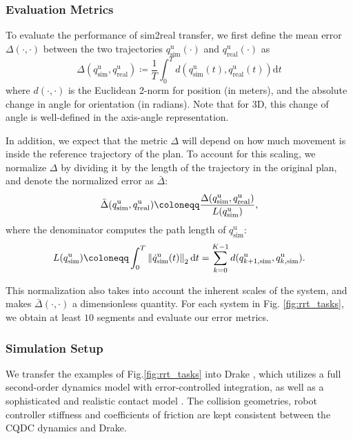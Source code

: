 \subsubsection{Evaluation Metrics}
To evaluate the performance of sim2real transfer, we first define the mean error $\Delta(\cdot,\cdot)$ between the two trajectories $q_\mathrm{sim}^\mathrm{u}(\cdot)$ and $q_\mathrm{real}^\mathrm{u}(\cdot)$ as
\begin{equation}
\Delta(q_\mathrm{sim}^\mathrm{u}, q_\mathrm{real}^\mathrm{u}) \coloneqq 
\frac{1}{T}
\int^T_{0} d\left(q_\mathrm{sim}^\mathrm{u}(t), q_\mathrm{real}^\mathrm{u}(t)\right) \mathrm{d}t
\end{equation}
where $d(\cdot,\cdot)$ is the Euclidean 2-norm for position (in meters), and the absolute change in angle for orientation (in radians). Note that for 3D, this change of angle is well-defined in the axis-angle representation. 

In addition, we expect that the metric $\Delta$ will depend on how much movement is inside the reference trajectory of the plan. To account for this scaling, we normalize $\Delta$ by dividing it by the length of the trajectory in the original plan, and denote the normalized error as $\bar{\Delta}$:
\begin{equation}
\bar{\Delta}(\qusimp, \qurealp) \coloneqq 
\frac{\Delta (q_\mathrm{sim}^\mathrm{u}, q_\mathrm{real}^\mathrm{u})}
{L(q_\mathrm{sim}^\mathrm{u})}
,
\end{equation}
where the denominator computes the path length of $q_\mathrm{sim}^\mathrm{u}$: 
\begin{equation}
L(q_\mathrm{sim}^\mathrm{u}) \coloneqq 
\int_0^T \norm{\Dot{q}_\mathrm{sim}^\mathrm{u}(t)}_2 \mathrm{d} t =
\sum^{K - 1}_{k=0}d(q^\mathrm{u}_{k+1,\mathrm{sim}}, q^\mathrm{u}_{k,\mathrm{sim}}).
\end{equation}

This normalization also takes into account the inherent scales of the system, and makes $\bar{\Delta}(\cdot,\cdot)$ a dimensionless quantity. For each system in Fig. \ref{fig:rrt_tasks}, we obtain at least $10$ segments and evaluate our error metrics. 

\subsubsection{Simulation Setup}
We transfer the examples of Fig.\ref{fig:rrt_tasks} into Drake \cite{drake}, which utilizes a full second-order dynamics model with error-controlled integration, as well as a sophisticated and realistic contact model \cite{tamsi}. The collision geometries, robot controller stiffness and coefficients of friction are kept consistent between the CQDC dynamics and Drake. 

